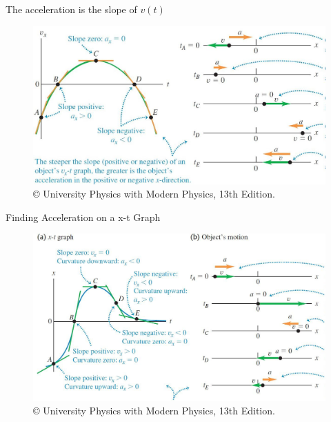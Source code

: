 \documentclass[]{beamer}
\begin{document}




\begin{frame}

The acceleration is the slope of $v(t)$
\vspace{3mm}

  \begin{figure}[h!]   
   \includegraphics[width=1.\textwidth]{images/13.jpg}
   \caption{ {\tiny © University Physics 
   with Modern Physics, 13th Edition.} }
\end{figure}

 \end{frame}







\begin{frame}

Finding Acceleration on a x-t Graph 
\vspace{3mm}

  \begin{figure}[h!]   
   \includegraphics[width=1.1\textwidth]{images/14.jpg}
   \caption{ {\tiny © University Physics 
   with Modern Physics, 13th Edition.} }
\end{figure}

 \end{frame}
\end{document}
